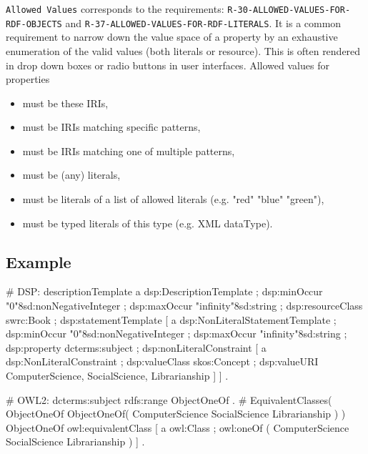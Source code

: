 \documentclass{llncs}
\newcommand{\ms}[1]{\texttt{#1}}
\begin{document}
\ms{Allowed Values} corresponds to the requirements:
\ms{R-30-ALLOWED-VALUES-FOR-} \ms{RDF-OBJECTS} and 
\ms{R-37-ALLOWED-VALUES-FOR-RDF-LITERALS}.
It is a common requirement to narrow down the value space of a property by an exhaustive enumeration of the valid values (both literals or resource). This is often rendered in drop down boxes or radio buttons in user interfaces. 
Allowed values for properties
\begin{itemize}
	\item must be these IRIs,
  \item must be IRIs matching specific patterns,
  \item must be IRIs matching one of multiple patterns,
  \item must be (any) literals,
  \item must be literals of a list of allowed literals (e.g. "red" "blue" "green"),
  \item must be typed literals of this type (e.g. XML dataType).
\end{itemize}

\subsection{Example}

\begin{ex}
# DSP:
descriptionTemplate 
    a dsp:DescriptionTemplate ;
    dsp:minOccur "0"^^xsd:nonNegativeInteger ; 
    dsp:maxOccur "infinity"^^xsd:string ; 
    dsp:resourceClass swrc:Book ; 
    dsp:statementTemplate [
        a dsp:NonLiteralStatementTemplate ;
        dsp:minOccur "0"^^xsd:nonNegativeInteger ; 
        dsp:maxOccur "infinity"^^xsd:string ; 
        dsp:property dcterms:subject ; 
        dsp:nonLiteralConstraint [ 
            a dsp:NonLiteralConstraint ;
            dsp:valueClass skos:Concept ;
            dsp:valueURI ComputerScience, SocialScience, Librarianship ] ] .
\end{ex}

\begin{ex}
# OWL2:
dcterms:subject rdfs:range ObjectOneOf . 
# EquivalentClasses( ObjectOneOf ObjectOneOf( ComputerScience SocialScience Librarianship ) )
ObjectOneOf owl:equivalentClass [ 
    a owl:Class ;
    owl:oneOf ( ComputerScience SocialScience Librarianship ) ] .
\end{ex}
\end{document}
